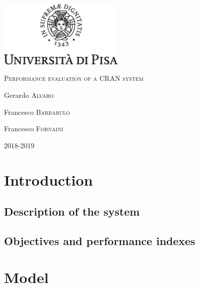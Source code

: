 \documentclass[11pt,a4paper,oneside, openright]{article}
\begin{document}
{
  \begin{titlepage}
  	\centering
  	\includegraphics[width=6cm]{images/unipi.eps}\par
  	\vspace{1.5cm}
  	{\huge\textsc{Performance evaluation of a CRAN system}\par}
  	\vspace{2cm}
  	Gerardo \textsc{Alvaro}\par
  	Francesco \textsc{Barbarulo}\par
    Francesco \textsc{Fornaini}

  	\vfill

  	{\large 2018-2019\par}
  \end{titlepage}
}


\tableofcontents

\newpage

\section{Introduction}

\subsection{Description of the system}

\subsection{Objectives and performance indexes}

\section{Model}
\end{document}
